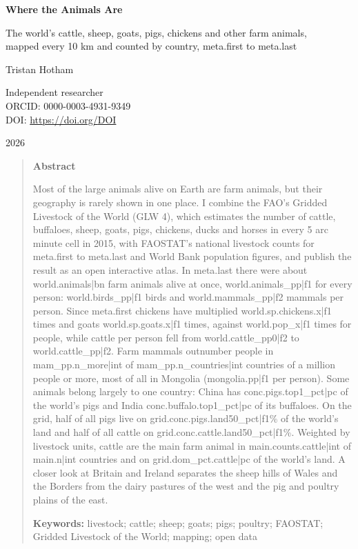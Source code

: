 \documentclass[11pt,a4paper]{article}
\begin{document}
\begin{center}
{\Large\bfseries Where the Animals Are\par}
\vspace{0.4em}
{\large The world's cattle, sheep, goats, pigs, chickens and other farm animals,\\mapped every 10 km and counted by country, {{meta.first}} to {{meta.last}}\par}
\vspace{1.2em}
{\large Tristan Hotham\par}
\vspace{0.3em}
{\small Independent researcher\\
ORCID: 0000-0003-4931-9349\\
DOI: \href{https://doi.org/{{DOI}}}{https://doi.org/{{DOI}}}\par}
\vspace{0.8em}
2026
\end{center}

\begin{quote}
\small
\begin{center}\textbf{Abstract}\end{center}
Most of the large animals alive on Earth are farm animals, but their geography is rarely shown in one place. I combine the FAO's Gridded Livestock of the World (GLW 4), which estimates the number of cattle, buffaloes, sheep, goats, pigs, chickens, ducks and horses in every 5 arc minute cell in 2015, with FAOSTAT's national livestock counts for {{meta.first}} to {{meta.last}} and World Bank population figures, and publish the result as an open interactive atlas. In {{meta.last}} there were about {{world.animals|bn}} farm animals alive at once, {{world.animals_pp|f1}} for every person: {{world.birds_pp|f1}} birds and {{world.mammals_pp|f2}} mammals per person. Since {{meta.first}} chickens have multiplied {{world.sp.chickens.x|f1}} times and goats {{world.sp.goats.x|f1}} times, against {{world.pop_x|f1}} times for people, while cattle per person fell from {{world.cattle_pp0|f2}} to {{world.cattle_pp|f2}}. Farm mammals outnumber people in {{mam_pp.n_more|int}} of {{mam_pp.n_countries|int}} countries of a million people or more, most of all in Mongolia ({{mongolia.pp|f1}} per person). Some animals belong largely to one country: China has {{conc.pigs.top1_pct|pc}} of the world's pigs and India {{conc.buffalo.top1_pct|pc}} of its buffaloes. On the grid, half of all pigs live on {{grid.conc.pigs.land50_pct|f1}}\% of the world's land and half of all cattle on {{grid.conc.cattle.land50_pct|f1}}\%. Weighted by livestock units, cattle are the main farm animal in {{main.counts.cattle|int}} of {{main.n|int}} countries and on {{grid.dom_pct.cattle|pc}} of the world's land. A closer look at Britain and Ireland separates the sheep hills of Wales and the Borders from the dairy pastures of the west and the pig and poultry plains of the east.

\textbf{Keywords:} livestock; cattle; sheep; goats; pigs; poultry; FAOSTAT; Gridded Livestock of the World; mapping; open data
\end{quote}
\end{document}

